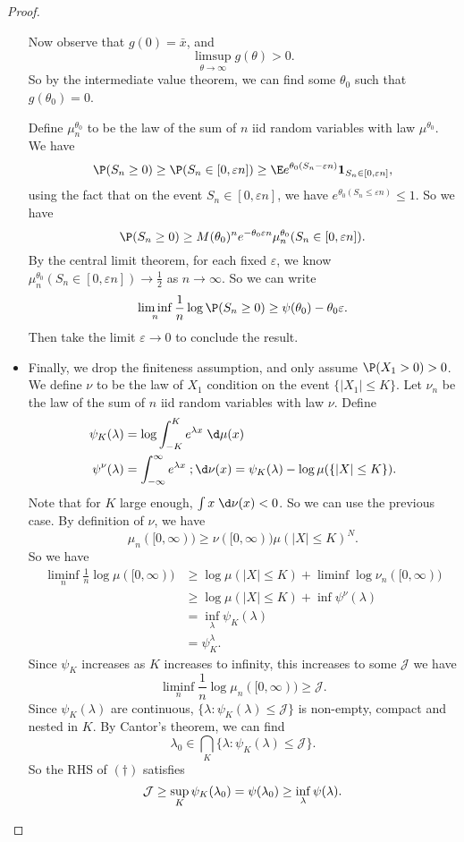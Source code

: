 \documentclass[a4paper]{article}
\begin{document}
\begin{proof}
\begin{itemize}
      Now observe that $g(0) = \bar{x}$, and
      \[
        \limsup_{\theta \to \infty} g(\theta) > 0.
      \]
      So by the intermediate value theorem, we can find some $\theta_0$ such that $g(\theta_0) = 0$.

      Define $\mu^{\theta_0}_n$ to be the law of the sum of $n$ iid random variables with law $\mu^{\theta_0}$. We have
      \[
        \P(S_n \geq 0) \geq \P(S_n \in [0, \varepsilon n]) \geq \E e^{\theta_0(S_n - \varepsilon n)} \mathbf{1}_{S_n \in [0, \varepsilon n]},
      \]
      using the fact that on the event $S_n \in [0, \varepsilon n]$, we have $e^{\theta_0 (S_n \leq \varepsilon n)} \leq 1$. So we have
      \[
        \P(S_n \geq 0) \geq M(\theta_0)^n e^{-\theta_0 \varepsilon n} \mu_n^{\theta_0} (S_n \in [0, \varepsilon n]).
      \]
      By the central limit theorem, for each fixed $\varepsilon$, we know $\mu_n^{\theta_0} (S_n \in [0, \varepsilon n]) \to \frac{1}{2}$ as $n \to \infty$. So we can write
      \[
        \liminf_n \frac{1}{n} \log \P(S_n \geq 0) \geq \psi(\theta_0) - \theta_0 \varepsilon.
      \]
      Then take the limit $\varepsilon \to 0$ to conclude the result.
    \item Finally, we drop the finiteness assumption, and only assume $\P(X_1 > 0) > 0$. We define $\nu$ to be the law of $X_1$ condition on the event $\{|X_1| \leq K\}$. Let $\nu_n$ be the law of the sum of $n$ iid random variables with law $\nu$. Define
      \begin{align*}
        \psi_K(\lambda) &= \log \int_{-K}^K e^{\lambda x} \;\d \mu(x)\\
        \psi^\nu(\lambda) &= \int_{-\infty}^\infty e^{\lambda x} \;;\d \nu(x) = \psi_K(\lambda) - \log \mu (\{|X| \leq K\}).
      \end{align*}
      Note that for $K$ large enough, $\int x \;\d \nu(x) < 0$. So we can use the previous case. By definition of $\nu$, we have
      \[
        \mu_n([0, \infty)) \geq \nu([0, \infty)) \mu(|X| \leq K)^N.
      \]
      So we have
      \begin{align*}
        \liminf_n \frac{1}{n} \log \mu([0, \infty)) &\geq \log \mu(|X| \leq K) + \liminf \log \nu_n([0, \infty))\\
        &\geq \log \mu(|X| \leq K) + \inf \psi^\nu (\lambda)\\
        &= \inf_\lambda \psi_K(\lambda)\\
        &= \psi_K^\lambda.
      \end{align*}
      Since $\psi_K$ increases as $K$ increases to infinity, this increases to some $\mathcal{J}$ we have
      \[
        \liminf_n \frac{1}{n} \log \mu_n([0, \infty)) \geq \mathcal{J}.\tag{$\dagger$}
      \]
      Since $\psi_K(\lambda)$ are continuous, $\{\lambda: \psi_K (\lambda) \leq \mathcal{J}\}$ is non-empty, compact and nested in $K$. By Cantor's theorem, we can find
      \[
        \lambda_0 \in \bigcap_K \{\lambda: \psi_K(\lambda) \leq \mathcal{J}\}.
      \]
      So the RHS of $(\dagger)$ satisfies
      \[
        \mathcal{J} \geq \sup_K \psi_K(\lambda _0) = \psi(\lambda_0) \geq \inf_\lambda \psi(\lambda).\qedhere
      \]
  \end{itemize}
\end{proof}
\printindex
\end{document}
